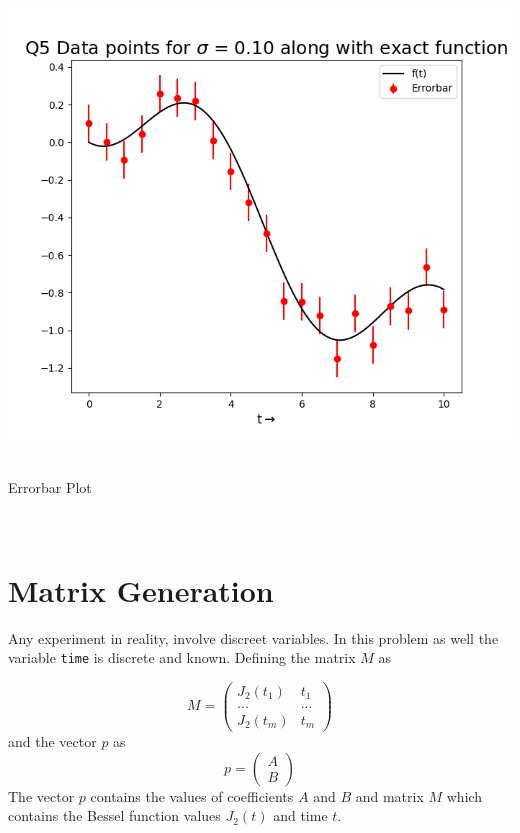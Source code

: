 \documentclass[12pt, a4paper]{report}
\begin{document}
\begin{center}
	\includegraphics[scale=0.80]{Figure_1} 
	\caption{\\Errorbar Plot}
	\label{fig:rawdata}
\end{center}
\\

\section*{Matrix Generation}
Any experiment in reality, involve discreet variables. In this problem as well the variable \texttt{time} is discrete and known. Defining the matrix $M$ as 

\begin{equation*}
M=
\begin{pmatrix}
J_{2}(t_{1}) & t_{1}\\
... & ... \\
J_{2}(t_{m}) & t_{m}
\end{pmatrix}
\end{equation*}
and the vector $p$ as 
\begin{equation*}
p =
\begin{pmatrix}
A\\B
\end{pmatrix}
\end{equation*}
The vector $p$ contains the values of coefficients $A$ and $B$ and matrix $M$ which contains the Bessel function values $J_{2}(t)$ and time $t$. 
\end{document}
